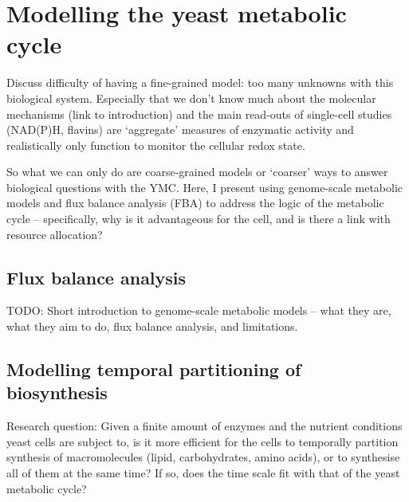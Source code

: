\chapter{Modelling the yeast metabolic cycle}
\label{ch:model}

Discuss difficulty of having a fine-grained model: too many unknowns with this biological system.
Especially that we don't know much about the molecular mechanisms (link to introduction) and the main read-outs of single-cell studies (NAD(P)H, flavins) are `aggregate' measures of enzymatic activity and realistically only function to monitor the cellular redox state.

So what we can only do are coarse-grained models or `coarser' ways to answer biological questions with the YMC.
Here, I present using genome-scale metabolic models and flux balance analysis (FBA) to address the logic of the metabolic cycle --
specifically, why is it advantageous for the cell, and is there a link with resource allocation?

\section{Flux balance analysis}
\label{sec:model-fba}

TODO: Short introduction to genome-scale metabolic models -- what they are, what they aim to do, flux balance analysis, and limitations.

\section{Modelling temporal partitioning of biosynthesis}
\label{sec:model-temporal}
Research question: Given a finite amount of enzymes and the nutrient conditions yeast cells are subject to, is it more efficient for the cells to temporally partition synthesis of macromolecules (lipid, carbohydrates, amino acids), or to synthesise all of them at the same time?
If so, does the time scale fit with that of the yeast metabolic cycle?

